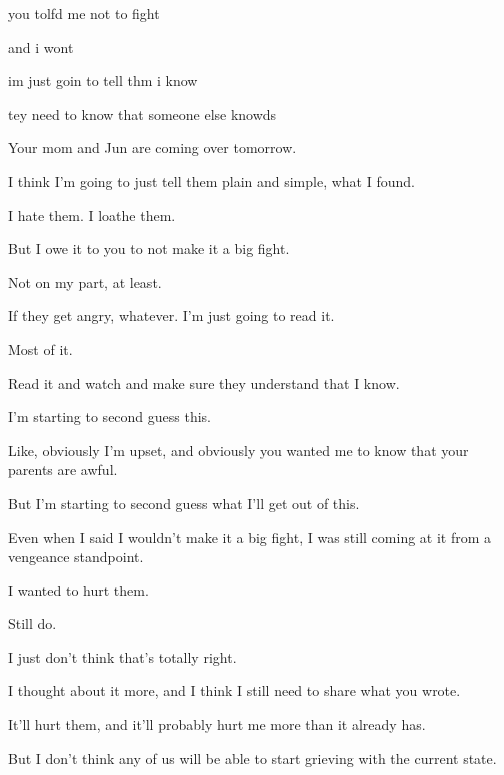 { you tolfd me not to fight

 and i wont

 im just goin to tell thm i know

 tey need to know that someone else knowds

\nopagebreak

 Your mom and Jun are coming over tomorrow.

 I think I'm going to just tell them plain and simple, what I found.

 I hate them. I loathe them.

 But I owe it to you to not make it a big fight.

 Not on my part, at least.

 If they get angry, whatever. I'm just going to read it.

 Most of it.

 Read it and watch and make sure they understand that I know.

 I'm starting to second guess this.

 Like, obviously I'm upset, and obviously you wanted me to know that your parents are awful.

 But I'm starting to second guess what I'll get out of this.

 Even when I said I wouldn't make it a big fight, I was still coming at it from a vengeance standpoint.

 I wanted to hurt them.

 Still do.

 I just don't think that's totally right.

 I thought about it more, and I think I still need to share what you wrote.

 It'll hurt them, and it'll probably hurt me more than it already has.

 But I don't think any of us will be able to start grieving with the current state.

}
